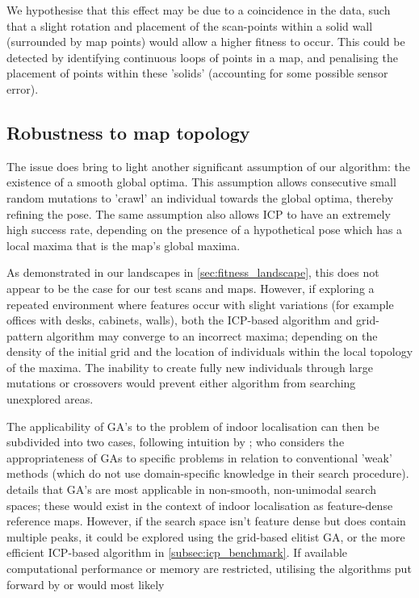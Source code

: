 \documentclass[authoryearcitations]{UoYCSproject}
\begin{document}
We hypothesise that this effect may be due to a coincidence in the data, such that a slight rotation and placement of the scan-points within a solid wall (surrounded by map points) would allow a higher fitness to occur. This could be detected by identifying continuous loops of points in a map, and penalising the placement of points within these 'solids' (accounting for some possible sensor error).


\subsection{Robustness to map topology}
\label{subsec:robustness_to_map_topology}
The issue does bring to light another significant assumption of our algorithm: the existence of a smooth global optima. This assumption allows consecutive small random mutations to 'crawl' an individual towards the global optima, thereby refining the pose. The same assumption also allows ICP to have an extremely high success rate, depending on the presence of a hypothetical pose which has a local maxima that is the map's global maxima. 

As demonstrated in our landscapes in \autoref{sec:fitness_landscape}, this does not appear to be the case for our test scans and maps. However, if exploring a repeated environment where features occur with slight variations (for example offices with desks, cabinets, walls), both the ICP-based algorithm and grid-pattern algorithm may converge to an incorrect maxima; depending on the density of the initial grid and the location of individuals within the local topology of the maxima. The inability to create fully new individuals through large mutations or crossovers would prevent either algorithm from searching unexplored areas.

The applicability of GA's to the problem of indoor localisation can then be subdivided into two cases, following intuition by \citet{Mitchell1998-td}; who considers the appropriateness of GAs to specific problems in relation to conventional 'weak' methods (which do not use domain-specific knowledge in their search procedure). \citeauthor{Mitchell1998-td} details that GA's are most applicable in non-smooth, non-unimodal search spaces; these would exist in the context of indoor localisation as feature-dense reference maps. However, if the search space isn't feature dense but does contain multiple peaks, it could be explored using the grid-based elitist GA, or the more efficient ICP-based algorithm in \autoref{subsec:icp_benchmark}. If available computational performance or memory are restricted, utilising the algorithms put forward by \citet{Robertson2002-ou} or \citet{Lenac2007-xm} would most likely 
\end{document}
